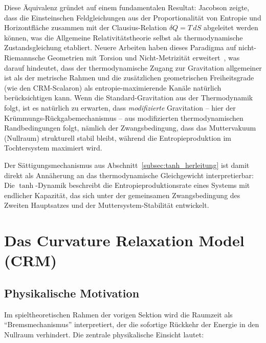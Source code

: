 \documentclass[aps,prd,twocolumn,superscriptaddress,nofootinbib]{revtex4-2}
\begin{document}
Diese \"Aquivalenz gr\"undet auf einem fundamentalen Resultat: Jacobson \cite{Jacobson1995} zeigte, dass die Einsteinschen Feldgleichungen aus der Proportionalit\"at von Entropie und Horizontfl\"ache zusammen mit der Clausius-Relation $\delta Q = T\,dS$ abgeleitet werden k\"onnen, was die Allgemeine Relativit\"atstheorie selbst als thermodynamische Zustandsgleichung etabliert. Neuere Arbeiten haben dieses Paradigma auf nicht-Riemannsche Geometrien mit Torsion und Nicht-Metrizit\"at erweitert~\cite{JacobsonNonRiemannian2026}, was darauf hindeutet, dass der thermodynamische Zugang zur Gravitation allgemeiner ist als der metrische Rahmen und die zus\"atzlichen geometrischen Freiheitsgrade (wie den CRM-Scalaron) als entropie-maximierende Kan\"ale nat\"urlich ber\"ucksichtigen kann. Wenn die Standard-Gravitation aus der Thermodynamik folgt, ist es nat\"urlich zu erwarten, dass \textit{modifizierte} Gravitation -- hier der Kr\"ummungs-R\"uckgabemechanismus -- aus modifizierten thermodynamischen Randbedingungen folgt, n\"amlich der Zwangsbedingung, dass das Muttervakuum (Nullraum) strukturell stabil bleibt, w\"ahrend die Entropieproduktion im Tochtersystem maximiert wird.

Der S\"attigungsmechanismus aus Abschnitt~\ref{subsec:tanh_herleitung} ist damit direkt als Ann\"aherung an das thermodynamische Gleichgewicht interpretierbar: Die $\tanh$-Dynamik beschreibt die Entropieproduktionsrate eines Systems mit endlicher Kapazit\"at, das sich unter der gemeinsamen Zwangsbedingung des Zweiten Hauptsatzes und der Muttersystem-Stabilit\"at entwickelt.

\section{Das Curvature Relaxation Model (CRM)}
\label{sec:krm}

\subsection{Physikalische Motivation}
\label{subsec:motivation}

Im spieltheoretischen Rahmen der vorigen Sektion wird die Raumzeit als ``Bremsmechanismus'' interpretiert, der die sofortige R\"uckkehr der Energie in den Nullraum verhindert. Die zentrale physikalische Einsicht lautet:
\end{document}
